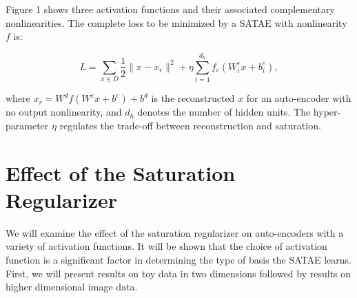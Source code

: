 \documentclass{article} %
\begin{document}
\noindent
Figure 1 shows three activation functions and their associated complementary nonlinearities. The complete loss to be minimized by a SATAE with nonlinearity $f$ is: 

\begin{equation} 
L = \sum_{x \in D} \frac{1}{2} \|x-x_r\|^2 + \eta \sum_{i=1}^{d_h}f_c(W^e_i x + b^e_i),
\end{equation}    

\noindent
where $x_r = W^df(W^e x + b^e) + b^d$ is the reconstructed $x$ for an auto-encoder with no output nonlinearity, and $d_h$ denotes the number of hidden units. The hyper-parameter $\eta$ regulates the trade-off between reconstruction and saturation.  

\section{Effect of the Saturation Regularizer} 
We will examine the effect of the saturation regularizer on auto-encoders with a variety of activation functions. It will be shown that the choice of activation function is a significant factor in determining the type of basis the SATAE learns. First, we will present results on toy data in two dimensions followed by results on higher dimensional image data.
\end{document}

